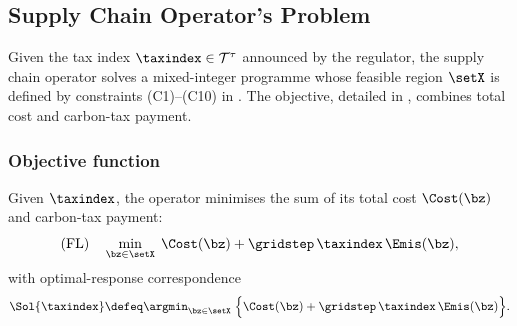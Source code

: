 
\subsection{Supply Chain Operator's Problem}
\label{sec:model:follower}

Given the tax index $\taxindex\in\mathcal{T}^{\tau}$ announced by the
regulator, the supply chain operator solves a mixed-integer programme
whose feasible region $\setX$ is defined by constraints (C1)--(C10) in
. The objective, detailed in ,
combines total cost and carbon-tax payment.

\subsubsection{Objective function}
\label{sec:model:follower_obj}

Given $\taxindex$, the operator minimises the sum of its total cost
$\Cost(\bz)$ and carbon-tax payment:
\begin{equation}
\textup{(FL)}\quad
\min_{\bz\in\setX}\;
\Cost(\bz) + \gridstep\,\taxindex\,\Emis(\bz),
\label{eq:follower}
\end{equation}
with optimal-response correspondence
\begin{equation}
\Sol{\taxindex} \defeq
\argmin_{\bz\in\setX}\;\Bigl\{\Cost(\bz) +
\gridstep\,\taxindex\,\Emis(\bz)\Bigr\}.
\label{eq:reaction_set}
\end{equation}

